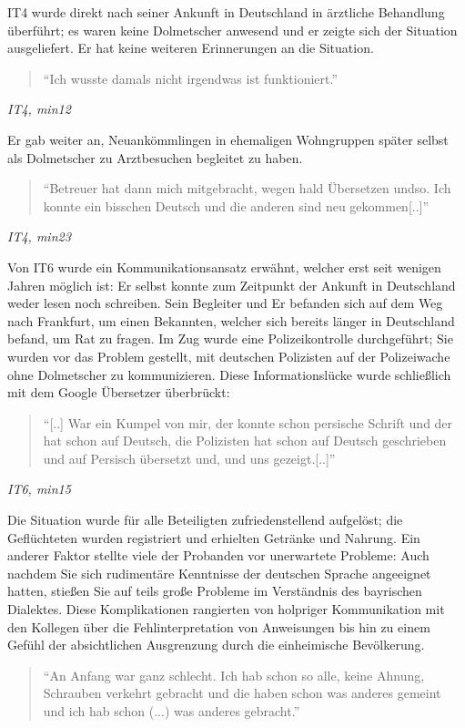 IT4 wurde direkt nach seiner Ankunft in Deutschland in ärztliche Behandlung überführt; es waren keine Dolmetscher anwesend und er zeigte sich der Situation ausgeliefert. Er hat keine weiteren Erinnerungen an die Situation.
\begin{quote}
    ``Ich wusste damals nicht irgendwas ist funktioniert.''
\end{quote}
\centerline{\textit{IT4, min12}}
Er gab weiter an, Neuankömmlingen in ehemaligen Wohngruppen später selbst als Dolmetscher zu Arztbesuchen begleitet zu haben.
\begin{quote}
    ``Betreuer hat dann mich mitgebracht, wegen hald Übersetzen undso. Ich konnte ein bisschen Deutsch und die anderen sind neu gekommen[..]''
\end{quote}
\centerline{\textit{IT4, min23}}
Von IT6 wurde ein Kommunikationsansatz erwähnt, welcher erst seit wenigen Jahren möglich ist:\newline
Er selbst konnte zum Zeitpunkt der Ankunft in Deutschland weder lesen noch schreiben. Sein Begleiter und Er befanden sich auf dem Weg nach Frankfurt, um einen Bekannten, welcher sich bereits länger in Deutschland befand, um Rat zu fragen. Im Zug wurde eine Polizeikontrolle durchgeführt; Sie wurden vor das Problem gestellt, mit deutschen Polizisten auf der Polizeiwache ohne Dolmetscher zu kommunizieren. Diese Informationslücke wurde schließlich mit dem Google Übersetzer überbrückt:
\begin{quote}
    ``[..] War ein Kumpel von mir, der konnte schon persische Schrift und der hat schon auf Deutsch, die Polizisten hat schon auf Deutsch geschrieben und auf Persisch übersetzt und, und uns gezeigt.[..]''
\end{quote}
\centerline{\textit{IT6, min15}}
Die Situation wurde für alle Beteiligten zufriedenstellend aufgelöst; die Geflüchteten wurden registriert und erhielten Getränke und Nahrung.
Ein anderer Faktor stellte viele der Probanden vor unerwartete Probleme:\newline
Auch nachdem Sie sich rudimentäre Kenntnisse der deutschen Sprache angeeignet hatten, stießen Sie auf teils große Probleme im Verständnis des bayrischen Dialektes. Diese Komplikationen rangierten von holpriger Kommunikation mit den Kollegen über die Fehlinterpretation von Anweisungen bis hin zu einem Gefühl der absichtlichen Ausgrenzung durch die einheimische Bevölkerung. \newline
\begin{quote}
    ``An Anfang war ganz schlecht. Ich hab schon so alle, keine Ahnung, Schrauben verkehrt gebracht und die haben schon was anderes gemeint und ich hab schon (...) was anderes gebracht.''
\end{quote}
